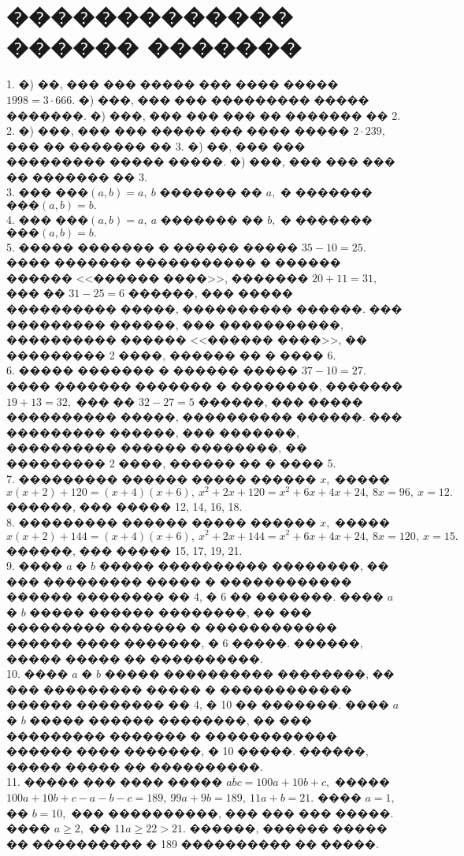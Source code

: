 \documentclass[12pt]{article}
\begin{document}
\section{������������� ������ �������}
1. �) ��, ��� ��� ����� ��� ���� ����� $1998=3\cdot666.$ �) ���, ��� ��� ��������� ����� �������. �) ���, ��� ��� ��� �� ������� �� 2.\\
2. �) ���, ��� ��� ����� ��� ���� ����� $2\cdot239,$ ��� �� ������� �� 3. �) ��, ��� ��� ��������� ����� �����. �) ���, ��� ��� ��� �� ������� �� 3.\\
3. ��� $\text{���}(a,b)=a,\ b$ ������� �� $a,$  � �������  $\text{���}(a,b)=b.$\\
4. ��� $\text{���}(a,b)=a,\ a$ ������� �� $b,$  � �������  $\text{���}(a,b)=b.$\\
5. ����� ������� � ������ ����� $35-10=25.$ ���� ������� ����������� � ������ ������ <<������ ����>>, ������� $20+11=31,$ ��� �� $31-25=6$ ������, ��� ����� ���������� �����, ���������� ������. ��� ��������� ������, ��� �����������, ���������� ������ <<������ ����>>, �� ��������� 2 ����, ������ �� � ���� 6.\\
6. ����� ������� � ������ ����� $37-10=27.$ ���� ������� ������� � ��������, ������� $19+13=32,$ ��� �� $32-27=5$ ������, ��� ����� ���������� �����, ���������� ������. ��� ��������� ������, ��� �������, ���������� ������ ��������, �� ��������� 2 ����, ������ �� � ���� 5.\\
7. ��������� ������ ����� ������ $x,$ ����� $x(x+2)+120=(x+4)(x+6),\ x^2+2x+120=x^2+6x+4x+24,\ 8x=96,\ x=12.$ ������, ��� ����� 12, 14, 16, 18.\\
8. ��������� ������ ����� ������ $x,$ ����� $x(x+2)+144=(x+4)(x+6),\ x^2+2x+144=x^2+6x+4x+24,\ 8x=120,\ x=15.$ ������, ��� ����� 15, 17, 19, 21.\\
9. ���� $a$ � $b$ ����� ���������� ��������, �� ��� ��������� ����� � ������������ ������ �������� �� 4, � 6 �� �������. ����
$a$ � $b$ ����� ������ ��������, �� ��� ��������� ������� � ������������ ������ ���� �������, � 6 �����. ������, ����� ����� �� ����������.\\
10. ���� $a$ � $b$ ����� ���������� ��������, �� ��� ��������� ����� � ������������ ������ �������� �� 4, � 10 �� �������. ����
$a$ � $b$ ����� ������ ��������, �� ��� ��������� ������� � ������������ ������ ���� �������, � 10 �����. ������, ����� ����� �� ����������.\\
11. ����� ��� ���� ����� $\overline{abc}=100a+10b+c,$ ����� $100a+10b+c-a-b-c=189,\ 99a+9b=189,\ 11a+b=21.$ ���� $a=1,$ �� $b=10,$ ��� ����������, ��� ��� ��� �����. ���� $a\geqslant2,$ �� $11a\geqslant22>21.$ ������, ������ ����� �� ���������� � 189 ���������� �� �����.\\
\end{document}
